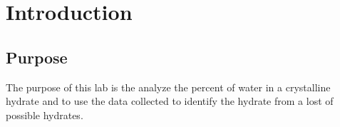 \documentclass[12pt]{article}
\begin{document}
		
		\tableofcontents
		\listoftables
		\listoffigures
		\pagebreak
		
		
		\section{Introduction}
		\subsection{Purpose}
		The purpose of this lab is the analyze the percent of water in a crystalline hydrate and to use the data collected to identify the hydrate from a lost of possible hydrates.
\end{document}
